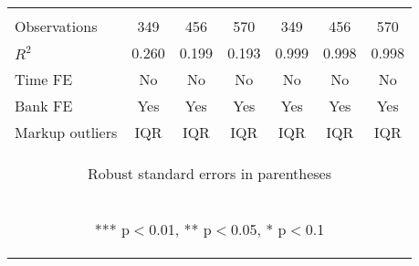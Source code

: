 \documentclass[]{article}
\begin{document}
\begin{center}
\begin{tabular}{lcccccc}
\vspace{4pt} & \begin{footnotesize}\end{footnotesize} & \begin{footnotesize}\end{footnotesize} & \begin{footnotesize}\end{footnotesize} & \begin{footnotesize}\end{footnotesize} & \begin{footnotesize}\end{footnotesize} & \begin{footnotesize}\end{footnotesize} \\
Observations & 349 & 456 & 570 & 349 & 456 & 570 \\
$R^2$ & 0.260 & 0.199 & 0.193 & 0.999 & 0.998 & 0.998 \\
Time FE & No & No & No & No & No & No \\
Bank FE & Yes & Yes & Yes & Yes & Yes & Yes \\
 Markup outliers & IQR & IQR & IQR & IQR & IQR & IQR \\ \hline
\multicolumn{7}{c}{\begin{footnotesize} Robust standard errors in parentheses\end{footnotesize}} \\
\multicolumn{7}{c}{\begin{footnotesize} *** p$<$0.01, ** p$<$0.05, * p$<$0.1\end{footnotesize}} \\
\end{tabular}
\end{center}
\end{document}

